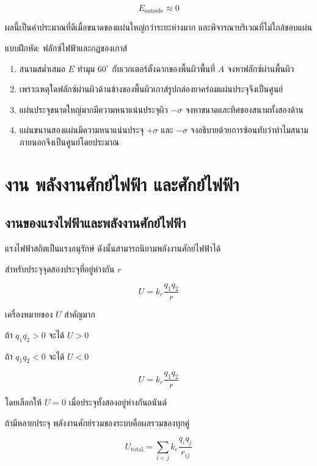 \[
\boxed{E_{\text{outside}}\approx0}
\]

ผลนี้เป็นค่าประมาณที่ดีเมื่อขนาดของแผ่นใหญ่กว่าระยะห่างมาก และพิจารณาบริเวณที่ไม่ใกล้ขอบแผ่น

\begin{exercisebox}{แบบฝึกหัด: ฟลักซ์ไฟฟ้าและกฎของเกาส์}
\begin{enumerate}
    \item สนามสม่ำเสมอ $E$ ทำมุม $60^\circ$ กับเวกเตอร์ตั้งฉากของพื้นผิวพื้นที่ $A$ จงหาฟลักซ์ผ่านพื้นผิว
    \item เพราะเหตุใดฟลักซ์ผ่านผิวด้านข้างของพื้นผิวเกาส์รูปกล่องยาคร่อมแผ่นประจุจึงเป็นศูนย์
    \item แผ่นประจุขนาดใหญ่มากมีความหนาแน่นประจุผิว $-\sigma$ จงหาขนาดและทิศของสนามทั้งสองด้าน
    \item แผ่นขนานสองแผ่นมีความหนาแน่นประจุ $+\sigma$ และ $-\sigma$ จงอธิบายด้วยการซ้อนทับว่าทำไมสนามภายนอกจึงเป็นศูนย์โดยประมาณ
\end{enumerate}
\end{exercisebox}

\section{งาน พลังงานศักย์ไฟฟ้า และศักย์ไฟฟ้า}

\subsection{งานของแรงไฟฟ้าและพลังงานศักย์ไฟฟ้า}

แรงไฟฟ้าสถิตเป็นแรงอนุรักษ์ ดังนั้นสามารถนิยามพลังงานศักย์ไฟฟ้าได้

สำหรับประจุจุดสองประจุที่อยู่ห่างกัน $r$

\[
U=k_e\frac{q_1q_2}{r}
\]

เครื่องหมายของ $U$ สำคัญมาก

ถ้า $q_1q_2>0$ จะได้ $U>0$

ถ้า $q_1q_2<0$ จะได้ $U<0$

\begin{tcolorbox}[title=พลังงานศักย์ไฟฟ้าของประจุสองตัว]
\[
U=k_e\frac{q_1q_2}{r}
\]

โดยเลือกให้ $U=0$ เมื่อประจุทั้งสองอยู่ห่างกันอนันต์
\end{tcolorbox}

ถ้ามีหลายประจุ พลังงานศักย์รวมของระบบคือผลรวมของทุกคู่

\[
U_{\text{total}}=\sum_{i<j} k_e\frac{q_iq_j}{r_{ij}}
\]

